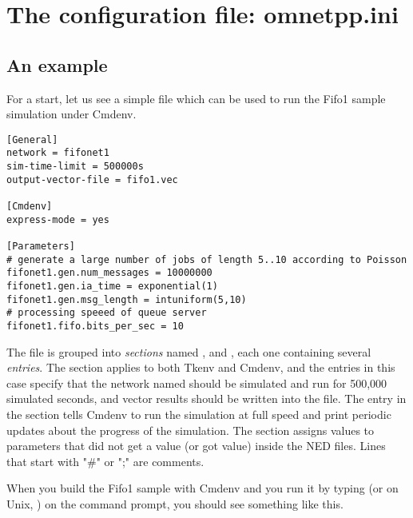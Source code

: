 \section{The configuration file: omnetpp.ini}

\subsection{An example}

For a start, let us see a simple  file which
can be used to run the Fifo1 sample simulation under Cmdenv.

\begin{verbatim}
[General]
network = fifonet1
sim-time-limit = 500000s
output-vector-file = fifo1.vec

[Cmdenv]
express-mode = yes

[Parameters]
# generate a large number of jobs of length 5..10 according to Poisson
fifonet1.gen.num_messages = 10000000
fifonet1.gen.ia_time = exponential(1)
fifonet1.gen.msg_length = intuniform(5,10)
# processing speeed of queue server
fifonet1.fifo.bits_per_sec = 10
\end{verbatim}

The file is grouped into \textit{sections} named \ttt{[General]}, \ttt{[Cmdenv]}
and \ttt{[Parameters]}, each one containing several \textit{entries}.
The \ttt{[General]} section applies to both Tkenv and Cmdenv, and the entries
in this case specify that the network named  should be simulated and run
for 500,000 simulated seconds, and vector results should be written into the
 file. The entry in the \ttt{[Cmdenv]} section tells
Cmdenv to run the simulation at full speed and print periodic updates
about the progress of the simulation. The \ttt{[Parameters]} section assigns
values to parameters that did not get a value (or got  value)
inside the NED files. Lines that start with "\#" or ";" are comments.

When you build the Fifo1 sample with Cmdenv and you run it by typing 
(or on Unix, ) on the command prompt, you should see
something like this.

